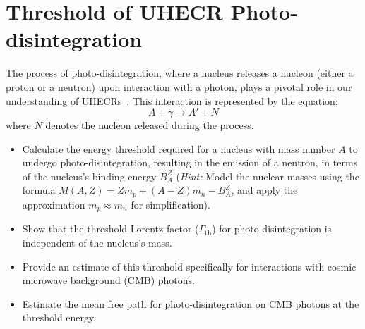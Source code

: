 \section{Threshold of UHECR Photo-disintegration}

The process of photo-disintegration, where a nucleus releases a nucleon (either a proton or a neutron) upon interaction with a photon, plays a pivotal role in our understanding of UHECRs~\cite{1969PhRv..180.1264S}. This interaction is represented by the equation:
%
\[A + \gamma \rightarrow A' + N\]
%
where \(N\) denotes the nucleon released during the process.

\begin{itemize}
\item Calculate the energy threshold required for a nucleus with mass number \(A\) to undergo photo-disintegration, resulting in the emission of a neutron, in terms of the nucleus's binding energy \(B_A^Z\) (\emph{Hint:} Model the nuclear masses using the formula \(M(A,Z) = Z m_p + (A - Z) m_n - B_A^Z\), and apply the approximation \(m_p \approx m_n\) for simplification).
\item Show that the threshold Lorentz factor (\(\Gamma_{\text{th}}\)) for photo-disintegration is independent of the nucleus's mass. 
\item Provide an estimate of this threshold specifically for interactions with cosmic microwave background (CMB) photons.
\item Estimate the mean free path for photo-disintegration on CMB photons at the threshold energy.
\end{itemize}
